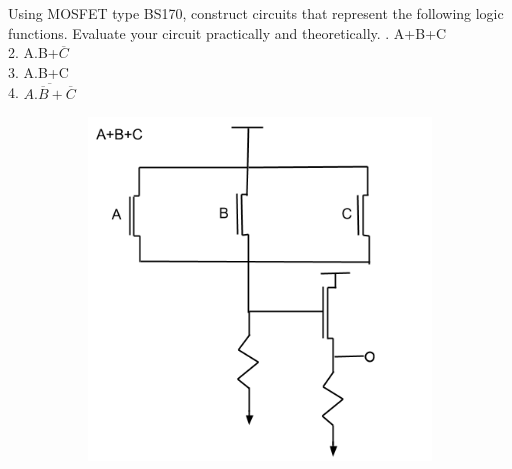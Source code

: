 {\begin{solution}
\begin{figure}[h!]
		\end{figure}
	\end{solution}
	\clearpage
	\begin{problem}
		Using MOSFET type BS170, construct circuits that represent the following logic functions. Evaluate your circuit practically and theoretically.
		. A+B+C \\
		2. A.B+\(\overline{C}\) \\
		3. A.B+C \\
		4. \(\overline{A.\overline{B}+\overline{C}}\)
	\end{problem}
	
	\begin{solution}
		\begin{figure}[h!]
			\centering
			\begin{subfigure}[H]{0.4\textwidth}
				\includegraphics[width=\textwidth]{images/solution431.png}
			\end{subfigure}
			\begin{subfigure}[H]{0.4\textwidth}

\end{subfigure}
\end{figure}
\end{solution}}

